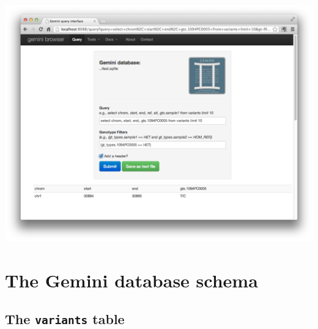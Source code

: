 \documentclass[letterpaper,10pt,english]{sphinxmanual}
\begin{document}
\includegraphics[width=600pt]{browser-query.png}


\section{The Gemini database schema}
\label{content/database_schema::doc}\label{content/database_schema:the-gemini-database-schema}

\subsection{The \texttt{variants} table}
\label{content/database_schema:the-variants-table}
\end{document}
